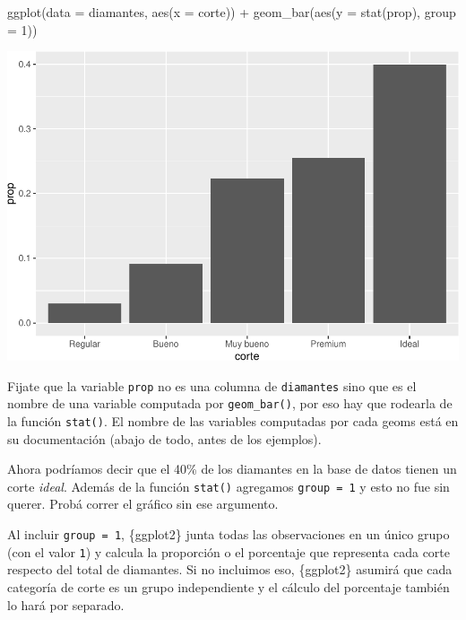 \documentclass[
  openany]{book}
\newenvironment{Shaded}{\begin{snugshade}}{\end{snugshade}}
\newcommand{\AttributeTok}[1]{\textcolor[rgb]{0.77,0.63,0.00}{#1}}
\newcommand{\DecValTok}[1]{\textcolor[rgb]{0.00,0.00,0.81}{#1}}
\newcommand{\FunctionTok}[1]{\textcolor[rgb]{0.00,0.00,0.00}{#1}}
\newcommand{\NormalTok}[1]{#1}
\newcommand{\SpecialCharTok}[1]{\textcolor[rgb]{0.00,0.00,0.00}{#1}}
\begin{document}
\begin{Shaded}
\begin{Highlighting}[]
\FunctionTok{ggplot}\NormalTok{(}\AttributeTok{data =}\NormalTok{ diamantes, }\FunctionTok{aes}\NormalTok{(}\AttributeTok{x =}\NormalTok{ corte)) }\SpecialCharTok{+}
  \FunctionTok{geom\_bar}\NormalTok{(}\FunctionTok{aes}\NormalTok{(}\AttributeTok{y =} \FunctionTok{stat}\NormalTok{(prop), }\AttributeTok{group =} \DecValTok{1}\NormalTok{))}
\end{Highlighting}
\end{Shaded}

\begin{center}\includegraphics[width=1\linewidth]{DT6_files/figure-latex/unnamed-chunk-62-1} \end{center}

Fijate que la variable \texttt{prop} no es una columna de \texttt{diamantes} sino que es el nombre de una variable computada por \texttt{geom\_bar()}, por eso hay que rodearla de la función \texttt{stat()}.
El nombre de las variables computadas por cada geoms está en su documentación (abajo de todo, antes de los ejemplos).

Ahora podríamos decir que el 40\% de los diamantes en la base de datos tienen un corte \emph{ideal}.
Además de la función \texttt{stat()} agregamos \texttt{group\ =\ 1} y esto no fue sin querer.
Probá correr el gráfico sin ese argumento.

Al incluir \texttt{group\ =\ 1}, \{ggplot2\} junta todas las observaciones en un único grupo (con el valor \texttt{1}) y calcula la proporción o el porcentaje que representa cada corte respecto del total de diamantes.
Si no incluimos eso, \{ggplot2\} asumirá que cada categoría de corte es un grupo independiente y el cálculo del porcentaje también lo hará por separado.
\end{document}
